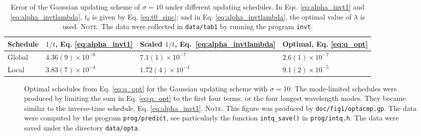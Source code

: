 \documentclass[reprint, floatfix]{revtex4-1}
\newcommand{\note}[1]{{\color{DarkGreen}\footnotesize \textsc{Note.} #1}}
\begin{document}
\begin{table}[h]\footnotesize
  \caption{\label{tab:error_Gaussian}
    Error of the Gaussian updating scheme of $\sigma = 10$
    under different updating schedules.
    In Eqs. \eqref{eq:alpha_invt1} and \eqref{eq:alpha_invtlambda},
    $t_0$ is given by Eq. \eqref{eq:t0_sinc};
    and in Eq. \eqref{eq:alpha_invtlambda},
    the optimal value of $\lambda$ is used.
    \note{\newline
      The data were collected in
      \texttt{data/tab1} by running
      the program \texttt{invt}.
    }%
  }
  \setlength{\tabcolsep}{2pt}
  \renewcommand\arraystretch{1.2}
  \begin{tabular} { l | p{2.2cm} p{2.4cm} p{2.0cm} }
    \hline
      Schedule
    &
      $1/t$, \newline
      Eq. \eqref{eq:alpha_invt1}
    &
      Scaled $1/t$, \newline
      Eq.~\eqref{eq:alpha_invtlambda}
    &
      Optimal, \newline
      Eq. \eqref{eq:q_opt}
    \\
    \hline
    Global
    &
    $4.36(9) \times 10^{-6}$
    &
    $7.1(1) \times 10^{-7}$
    &
    $2.6(1) \times 10^{-7}$
    \\
    \hline
    Local
    &
    $3.83(7) \times 10^{-4}$
    &
    $1.72(4) \times 10^{-4}$
    &
    $9.1(2) \times 10^{-5}$
    \\
    \hline
  \end{tabular}
\end{table}


\begin{figure}[h]
\begin{center}
  \caption{
    \label{fig:optacmp}
    Optimal schedules from Eq. \eqref{eq:q_opt}
    for the Gaussian updating scheme
    with $\sigma = 10$.
    The mode-limited schedules were produced by
    limiting the sum in Eq. \eqref{eq:q_opt}
    to the first four terms,
    or the four longest wavelength modes.
    They became similar to the inverse-time schedule,
    Eq. \eqref{eq:alpha_invt1}.
    \note{This figure was produced by \texttt{doc/fig1/optacmp.gp}.
      The data were computed by the program \texttt{prog/predict},
      see particularly the function \texttt{intq\_save()}
      in \texttt{prog/intq.h}.
      The data were saved under the directory \texttt{data/opta}.
    }%
  }
\end{center}
\end{figure}
\end{document}
